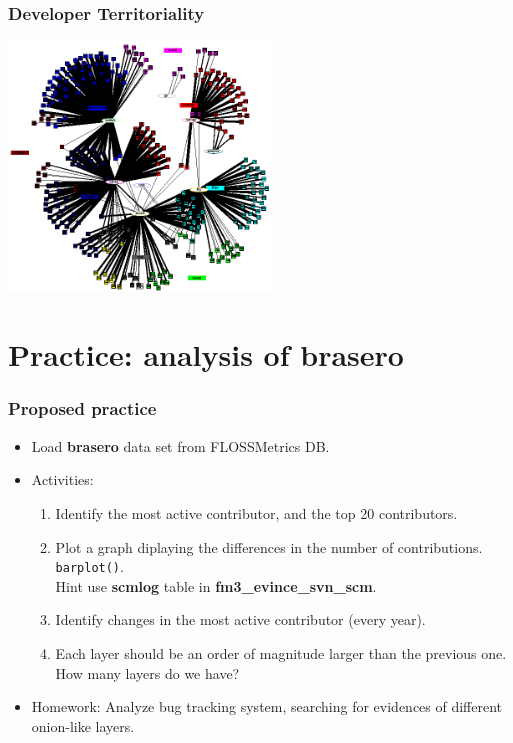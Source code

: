\documentclass{beamer}
\begin{document}
\begin{frame}
\frametitle{Developer Territoriality}

\begin{center}
\includegraphics[width=7cm]{figs/german-territoriality.png}
\end{center}

\end{frame}


\section{Practice: analysis of \bfseries{brasero}}


\begin{frame}
\frametitle{Proposed practice}
 \begin{itemize}
  \item Load \textbf{brasero} data set from FLOSSMetrics DB.
  \item Activities:
  \begin{enumerate}
   \item Identify the most active contributor, and the top 20 contributors.
   \item Plot a graph diplaying the differences in the number of contributions.
   \texttt{barplot()}.\\Hint use \textbf{scmlog} table in \textbf{fm3\_evince\_svn\_scm}.
   \item Identify changes in the most active contributor (every year).\\
   \item Each layer should be an order of magnitude larger than the
   previous one. How many layers do we have?
  \end{enumerate}
  \item Homework: Analyze bug tracking system, searching for evidences
  of different onion-like layers.
 \end{itemize}
\end{frame}
\end{document}
